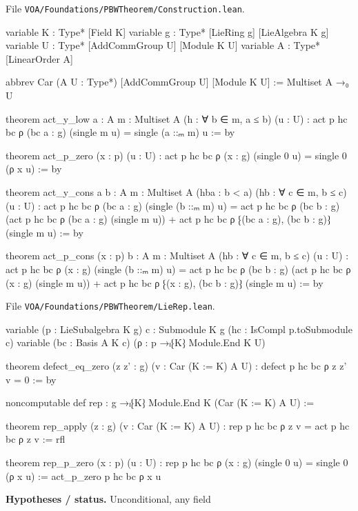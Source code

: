 \documentclass[11pt,openany]{book}
\newcommand{\leanpath}[1]{\texttt{\small #1}}
\theoremstyle{definition}
\theoremstyle{plain}
\begin{document}
{\raggedright\noindent File \leanpath{VOA/\allowbreak Foundations/\allowbreak PBWTheorem/\allowbreak Construction.lean}.\par}
\begin{leancode}
variable {K : Type*} [Field K]
variable {g : Type*} [LieRing g] [LieAlgebra K g]
variable {U : Type*} [AddCommGroup U] [Module K U]
variable {A : Type*} [LinearOrder A]

abbrev Car (A U : Type*) [AddCommGroup U] [Module K U] := Multiset A →₀ U
\end{leancode}
\begin{leancode}
theorem act_y_low {a : A} {m : Multiset A} (h : ∀ b ∈ m, a ≤ b) (u : U) :
    act p hc bc ρ (bc a : g) (single m u) = single (a ::ₘ m) u := by

theorem act_p_zero (x : p) (u : U) :
    act p hc bc ρ (x : g) (single 0 u) = single 0 (ρ x u) := by

theorem act_y_cons {a b : A} {m : Multiset A} (hba : b < a) (hb : ∀ c ∈ m, b ≤ c) (u : U) :
    act p hc bc ρ (bc a : g) (single (b ::ₘ m) u) =
      act p hc bc ρ (bc b : g) (act p hc bc ρ (bc a : g) (single m u)) +
        act p hc bc ρ ⁅(bc a : g), (bc b : g)⁆ (single m u) := by

theorem act_p_cons (x : p) {b : A} {m : Multiset A} (hb : ∀ c ∈ m, b ≤ c) (u : U) :
    act p hc bc ρ (x : g) (single (b ::ₘ m) u) =
      act p hc bc ρ (bc b : g) (act p hc bc ρ (x : g) (single m u)) +
        act p hc bc ρ ⁅(x : g), (bc b : g)⁆ (single m u) := by
\end{leancode}
{\raggedright\noindent File \leanpath{VOA/\allowbreak Foundations/\allowbreak PBWTheorem/\allowbreak LieRep.lean}.\par}
\begin{leancode}
variable (p : LieSubalgebra K g) {c : Submodule K g} (hc : IsCompl p.toSubmodule c)
variable (bc : Basis A K c) (ρ : p →ₗ⁅K⁆ Module.End K U)

theorem defect_eq_zero (z z' : g) (v : Car (K := K) A U) : defect p hc bc ρ z z' v = 0 := by

noncomputable def rep : g →ₗ⁅K⁆ Module.End K (Car (K := K) A U) :=

theorem rep_apply (z : g) (v : Car (K := K) A U) : rep p hc bc ρ z v = act p hc bc ρ z v := rfl

theorem rep_p_zero (x : p) (u : U) :
    rep p hc bc ρ (x : g) (single 0 u) = single 0 (ρ x u) :=
  act_p_zero p hc bc ρ x u
\end{leancode}
\noindent\textbf{Hypotheses / status.} Unconditional, any field\par
\end{document}
